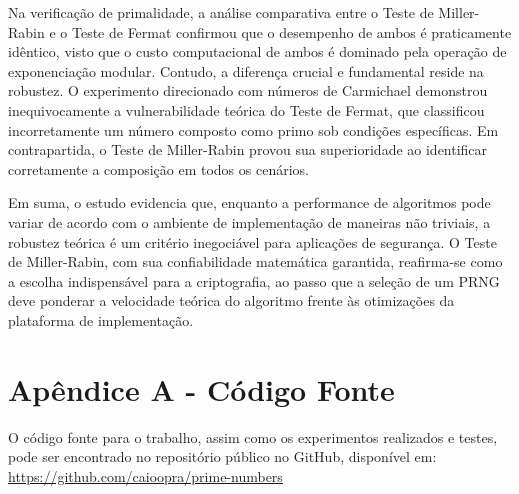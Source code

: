 \documentclass[a4paper, 11pt]{article}
\begin{document}
Na verificação de primalidade, a análise comparativa entre o Teste de Miller-Rabin e o Teste de Fermat confirmou que o desempenho de ambos é praticamente idêntico, visto que o custo computacional de ambos é dominado pela operação de exponenciação modular.  Contudo, a diferença crucial e fundamental reside na robustez. O experimento direcionado com números de Carmichael demonstrou inequivocamente a vulnerabilidade teórica do Teste de Fermat, que classificou incorretamente um número composto como primo sob condições específicas. Em contrapartida, o Teste de Miller-Rabin provou sua superioridade ao identificar corretamente a composição em todos os cenários.

Em suma, o estudo evidencia que, enquanto a performance de algoritmos pode variar de acordo com o ambiente de implementação de maneiras não triviais, a robustez teórica é um critério inegociável para aplicações de segurança. O Teste de Miller-Rabin, com sua confiabilidade matemática garantida, reafirma-se como a escolha indispensável para a criptografia, ao passo que a seleção de um PRNG deve ponderar a velocidade teórica do algoritmo frente às otimizações da plataforma de implementação.



\newpage

\printbibliography

\newpage
\appendix
\section{Apêndice A - Código Fonte}
\label{app-a}

O código fonte para o trabalho, assim como os experimentos realizados e testes, pode ser encontrado no repositório público no GitHub, disponível em: \url{https://github.com/caioopra/prime-numbers}
\end{document}
